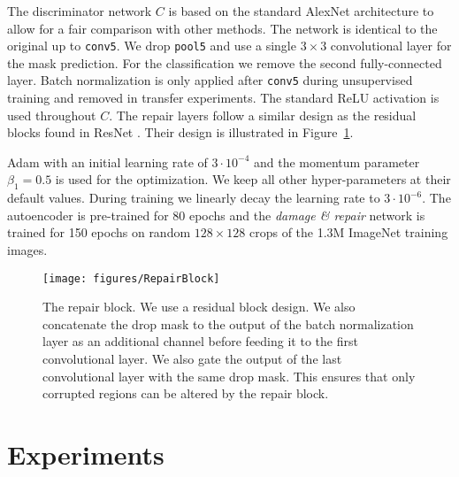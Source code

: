 \documentclass[10pt,twocolumn,letterpaper]{article}
\begin{document}
The discriminator network $C$ is based on the standard AlexNet architecture \cite{krizhevsky2012imagenet} to allow for a fair comparison with other methods. The network is identical to the original up to \texttt{conv5}. We drop \texttt{pool5} and use a single $3\times3$ convolutional layer for the mask prediction. For the classification we remove the second fully-connected layer. Batch normalization is only applied after \texttt{conv5} during unsupervised training and removed in transfer experiments. The standard ReLU activation is used throughout $C$.
The repair layers follow a similar design as the residual blocks found in ResNet \cite{he2016deep}. Their design is illustrated in Figure~\ref{fig:repairblock}.

Adam \cite{kingma2014adam} with an initial learning rate of $3\cdot10^{-4}$ and the momentum parameter $\beta_1=0.5$ is used for the optimization. We keep all other hyper-parameters at their default values. During training we linearly decay the learning rate to $3\cdot10^{-6}$. The autoencoder is pre-trained for 80 epochs and the \emph{damage \& repair} network is trained for 150 epochs on random $128\times128$ crops of the 1.3M ImageNet \cite{imagenet_cvpr09} training images.

\begin{figure}[t]
	\begin{center}
  	\texttt{[image: figures/RepairBlock]}
 	\end{center}
   \caption{The repair block. We use a residual block design. We also concatenate the drop mask to the output of the batch normalization layer as an additional channel before feeding it to the first convolutional layer. We also gate the output of the last convolutional layer with the same drop mask. This ensures that only corrupted regions can be altered by the repair block.}
\label{fig:repairblock}
\end{figure}


\section{Experiments}

\end{document}
